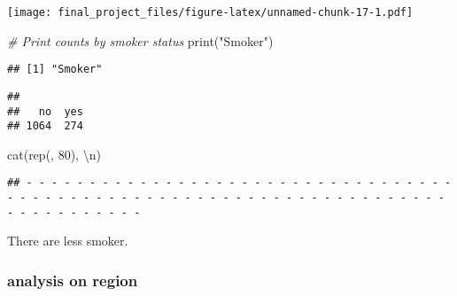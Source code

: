\documentclass[
]{article}
\newenvironment{Shaded}{\begin{snugshade}}{\end{snugshade}}
\newcommand{\CommentTok}[1]{\textcolor[rgb]{0.56,0.35,0.01}{\textit{#1}}}
\newcommand{\DecValTok}[1]{\textcolor[rgb]{0.00,0.00,0.81}{#1}}
\newcommand{\FunctionTok}[1]{\textcolor[rgb]{0.00,0.00,0.00}{#1}}
\newcommand{\NormalTok}[1]{#1}
\newcommand{\OtherTok}[1]{\textcolor[rgb]{0.56,0.35,0.01}{#1}}
\newcommand{\SpecialCharTok}[1]{\textcolor[rgb]{0.00,0.00,0.00}{#1}}
\newcommand{\StringTok}[1]{\textcolor[rgb]{0.31,0.60,0.02}{#1}}
\begin{document}
\texttt{[image: final\_project\_files/figure-latex/unnamed-chunk-17-1.pdf]}

\begin{Shaded}
\begin{Highlighting}[]
\CommentTok{\# Print counts by smoker status}
\FunctionTok{print}\NormalTok{(}\StringTok{"Smoker"}\NormalTok{)}
\end{Highlighting}
\end{Shaded}

\begin{verbatim}
## [1] "Smoker"
\end{verbatim}

\begin{Shaded}
\end{Shaded}

\begin{verbatim}
## 
##   no  yes 
## 1064  274
\end{verbatim}

\begin{Shaded}
\begin{Highlighting}[]
\FunctionTok{cat}\NormalTok{(}\FunctionTok{rep}\NormalTok{(}\StringTok{\textquotesingle{}{-}\textquotesingle{}}\NormalTok{, }\DecValTok{80}\NormalTok{), }\StringTok{\textquotesingle{}}\SpecialCharTok{\textbackslash{}n}\StringTok{\textquotesingle{}}\NormalTok{)}
\end{Highlighting}
\end{Shaded}

\begin{verbatim}
## - - - - - - - - - - - - - - - - - - - - - - - - - - - - - - - - - - - - - - - - - - - - - - - - - - - - - - - - - - - - - - - - - - - - - - - - - - - - - - - -
\end{verbatim}

There are less smoker.

\hypertarget{analysis-on-region}{%
\subsubsection{analysis on region}\label{analysis-on-region}}
\end{document}
